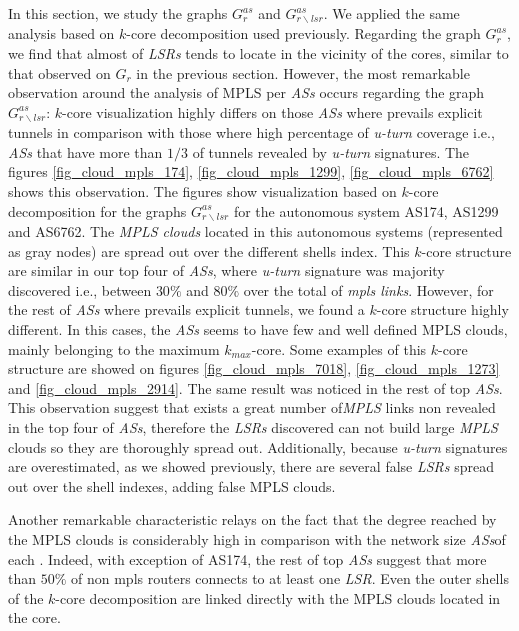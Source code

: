 In this section, we study the graphs $G^{as}_{r}$ and $G^{as}_{r\backslash lsr}$. We applied the same analysis based on $k$-core decomposition used previously.  Regarding the graph $G^{as}_{r}$, we find that almost of \textit{LSRs} tends to locate in the vicinity of the cores, similar to that observed on $G_{r}$ in the previous section. However, the most remarkable observation around the analysis of MPLS per \textit{ASs} occurs regarding the graph $G^{as}_{r\backslash lsr}$: $k$-core visualization highly differs on those \textit{ASs} where prevails explicit tunnels in comparison with those where high percentage of \textit{u-turn} coverage i.e., \textit{ASs} that have more than $1/3$ of tunnels revealed by \textit{u-turn} signatures. The figures \ref{fig_cloud_mpls_174}, \ref{fig_cloud_mpls_1299}, \ref{fig_cloud_mpls_6762} shows this observation. The figures show visualization based on $k$-core decomposition for the graphs $G^{as}_{r\backslash lsr}$  for the autonomous system AS174, AS1299 and AS6762. The \textit{MPLS clouds} located in this autonomous systems (represented as gray nodes) are spread out over the different shells index. This $k$-core structure are similar in our top four of \textit{ASs}, where \textit{u-turn} signature was majority discovered i.e., between $30\%$ and  $80\%$ over  the total of \textit{mpls links}. However, for the rest of \textit{ASs} where prevails explicit tunnels, we found a $k$-core structure highly different.  In this cases,  the \textit{ASs} seems to have few and well defined MPLS clouds, mainly belonging to the maximum $k_{max}$-core. Some examples of this $k$-core structure are showed on figures \ref{fig_cloud_mpls_7018}, \ref{fig_cloud_mpls_1273} and \ref{fig_cloud_mpls_2914}. The same result was noticed in the rest of top \textit{ASs}. This observation suggest that exists a great number of\textit{MPLS} links non revealed in the top four of \textit{ASs}, therefore  the \textit{LSRs} discovered can not build large \textit{MPLS} clouds so they are thoroughly spread out. Additionally, because \textit{u-turn} signatures are overestimated, as we showed previously, there are several false \textit{LSRs} spread out over the shell indexes, adding false MPLS clouds.

Another remarkable characteristic  relays on the fact that the degree reached by the MPLS clouds is considerably high in comparison with the network size \textit{ASs}of each . Indeed, with exception of AS174, the rest of top \textit{ASs } suggest that more than $50\%$ of non mpls routers connects to at least one \textit{LSR}. Even the outer shells of the $k$-core decomposition are linked directly with the MPLS clouds located in the core. 

